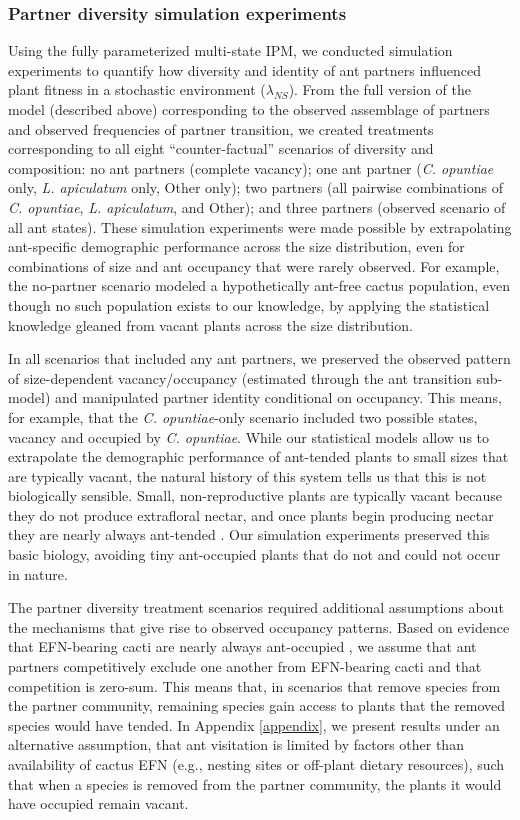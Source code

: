\documentclass[11pt]{article}
\begin{document}
\subsubsection*{Partner diversity simulation experiments}
Using the fully parameterized multi-state IPM, we conducted simulation experiments to quantify how diversity and identity of ant partners influenced plant fitness in a stochastic environment ($\lambda_{NS}$). 
From the full version of the model (described above) corresponding to the observed assemblage of partners and observed frequencies of partner transition, we created treatments corresponding to all eight ``counter-factual'' scenarios of diversity and composition: no ant partners (complete vacancy); one ant partner (\textit{C. opuntiae} only, \textit{L. apiculatum} only, Other only); two partners (all pairwise combinations of \textit{C. opuntiae}, \textit{L. apiculatum}, and Other); and three partners (observed scenario of all ant states).
These simulation experiments were made possible by extrapolating ant-specific demographic performance across the size distribution, even for combinations of size and ant occupancy that were rarely observed. 
For example, the no-partner scenario modeled a hypothetically ant-free cactus population, even though no such population exists to our knowledge, by applying the statistical knowledge gleaned from vacant plants across the size distribution. 

In all scenarios that included any ant partners, we preserved the observed pattern of size-dependent vacancy/occupancy (estimated through the ant transition sub-model) and manipulated partner identity conditional on occupancy. 
This means, for example, that the \textit{C. opuntiae}-only scenario included two possible states, vacancy and occupied by \textit{C. opuntiae}. 
While our statistical models allow us to extrapolate the demographic performance of ant-tended plants to small sizes that are typically vacant, the natural history of this system tells us that this is not biologically sensible. 
Small, non-reproductive plants are typically vacant because they do not produce extrafloral nectar, and once plants begin producing nectar they are nearly always ant-tended \citep{Miller2014}. 
Our simulation experiments preserved this basic biology, avoiding tiny ant-occupied plants that do not and could not occur in nature. 

The partner diversity treatment scenarios required additional assumptions about the mechanisms that give rise to observed occupancy patterns. 
Based on evidence that EFN-bearing cacti are nearly always ant-occupied \citep{Miller2014}, we assume that ant partners competitively exclude one another from EFN-bearing cacti and that competition is zero-sum. 
This means that, in scenarios that remove species from the partner community, remaining species gain access to plants that the removed species would have tended. 
In Appendix \ref{appendix}, we present results under an alternative assumption, that ant visitation is limited by factors other than availability of cactus EFN (e.g., nesting sites or off-plant dietary resources), such that when a species is removed from the partner community, the plants it would have occupied remain vacant. 
\end{document}
